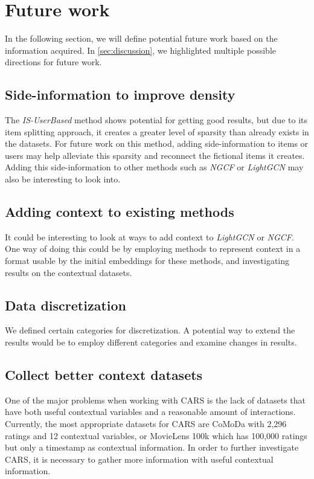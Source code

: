 \section{Future work}\label{sec:futurework}
In the following section, we will define potential future work based on the information acquired.
In \autoref{sec:discussion}, we highlighted multiple possible directions for future work.

\subsection{Side-information to improve density}
The \textit{IS-UserBased} method shows potential for getting good results, but due to its item splitting approach, it creates a greater level of sparsity than already exists in the datasets.
For future work on this method, adding side-information to items or users may help alleviate this sparsity and reconnect the fictional items it creates.
Adding this side-information to other methods such as \textit{NGCF} or \textit{LightGCN} may also be interesting to look into.

\subsection{Adding context to existing methods}
It could be interesting to look at ways to add context to \textit{LightGCN} or \textit{NGCF}.
One way of doing this could be by employing methods to represent context in a format usable by the initial embeddings for these methods, and investigating results on the contextual datasets.

\subsection{Data discretization}
We defined certain categories for discretization.
A potential way to extend the results would be to employ different categories and examine changes in results.

\subsection{Collect better context datasets}
One of the major problems when working with CARS is the lack of datasets that have both useful contextual variables and a reasonable amount of interactions.
Currently, the most appropriate datasets for CARS are CoMoDa with 2,296 ratings and 12 contextual variables, or MovieLens 100k which has 100,000 ratings but only a timestamp as contextual information.
In order to further investigate CARS, it is necessary to gather more information with useful contextual information.
